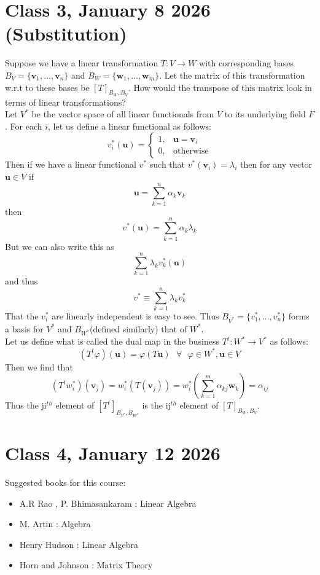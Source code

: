\documentclass{article}
\begin{document}
\section*{Class 3, January 8 2026 (Substitution)}
Suppose we have a linear transformation $T:V \to W$ with corresponding bases 
$B_V=\{ \textbf{v}_1,\dots,\textbf{v}_n\}$ and $B_W=\{\textbf{w}_1,\dots,\textbf{w}_m\}$. 
Let the matrix of this transformation w.r.t to these bases be $[T]_{B_W,B_V}$. How would the transpose of this matrix look in terms of linear transformations?\\
Let $V^{*}$ be the vector space of all linear functionals from $V$ to its underlying field $F$.
For each $i$, let us define a linear functional as follows:
\[
v_i^*(\mathbf{u}) =
\begin{cases}
1, & \mathbf{u}=\mathbf{v}_i \\
0, & \text{otherwise}
\end{cases}
\]
Then if we have a linear functional $v^{*}$ such that $v^{*}(\mathbf{v}_i)=\lambda_i$ then for any vector $\mathbf{u}\in V$
if $$\mathbf{u}=\sum_{k=1}^{n}\alpha_k \mathbf{v}_k$$
then $$v^{*}(\mathbf{u})=\sum_{k=1}^{n}\alpha_k\lambda_k$$
But we can also write this as $$\sum_{k=1}^{n}\lambda_k v^{*}_k(\mathbf{u})$$
and thus $$v^{*}\equiv \sum_{k=1}^{n}\lambda_k v^{*}_k$$
That the $v^{*}_i$ are linearly independent is easy to see. Thus $B_{V^{*}}=\{v^{*}_1,\dots,v^{*}_n\}$ forms a basis for $V^{*}$ and $B_{W^{*}}$(defined similarly) that of $W^{*}$.\\
Let us define what is called the dual map in the business $T^{t}:W^{*}\to V^{*}$ as follows:
$$(T^{t}\varphi)(\mathbf{u})=\varphi(T\mathbf{u})\text{ }\forall \text{ }\varphi\in W^{*},\mathbf{u}\in V$$
Then we find that 
$$(T^{t}w^{*}_i)(\mathbf{v}_j)=w^{*}_i(T(\mathbf{v}_j))=w^{*}_i(\sum_{k=1}^{m}\alpha_{kj} \mathbf{w}_k)=\alpha_{ij}$$
Thus the $\text{ji}^{th}$ element of $[T^{t}]_{B_{V^{*}},B_{W^{*}}}$ is the $\text{ij}^{th}$ element of $[T]_{B_{W},B_{V}}$.
\section*{Class 4, January 12 2026}
Suggested books for this course:
\begin{itemize}
\item A.R Rao , P. Bhimasankaram : Linear Algebra
\item M. Artin : Algebra
\item Henry Hudson : Linear Algebra
\item Horn and Johnson : Matrix Theory
\end{itemize}
\end{document}
